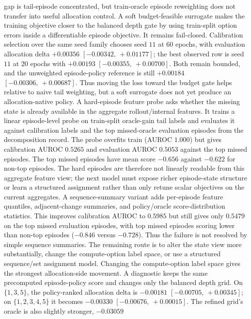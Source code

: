 gap is tail-episode concentrated, but train-oracle episode reweighting does not
transfer into useful allocation control.
A soft budget-feasible surrogate makes the training objective closer to the
balanced depth gate by using train-split option errors inside a differentiable
episode objective.  It remains fail-closed.  Calibration selection over the
same seed family chooses seed $11$ at $60$ epochs, with evaluation allocation
delta $+0.00356$ $[-0.00342,\ +0.01177]$; the best observed row is seed $11$ at
$20$ epochs with $+0.00193$ $[-0.00355,\ +0.00700]$.  Both remain bounded, and
the unweighted episode-policy reference is still $+0.00184$
$[-0.00306,\ +0.00687]$.  Thus moving the loss toward the budget gate helps
relative to naive tail weighting, but a soft surrogate does not yet produce an
allocation-native policy.
A hard-episode feature probe asks whether the missing state is already
available in the aggregate rollout/internal features.  It trains a linear
episode-level probe on train-split oracle-gain tail labels and evaluates it
against calibration labels and the top missed-oracle evaluation episodes from
the decomposition record.  The probe overfits train (AUROC $1.000$) but gives
calibration AUROC $0.5265$ and evaluation AUROC $0.5053$ against the top missed
episodes.  The top missed episodes have mean score $-0.656$ against $-0.622$
for non-top episodes.  The hard episodes are therefore not linearly readable
from this aggregate feature view; the next model must expose richer
episode-state structure or learn a structured assignment rather than only
retune scalar objectives on the current aggregates.
A sequence-summary variant adds per-episode feature quantiles,
adjacent-change summaries, and policy/oracle score-distribution statistics.
This improves calibration AUROC to $0.5985$ but still gives only $0.5479$ on
the top missed evaluation episodes, with top missed episodes scoring lower
than non-top episodes ($-0.846$ versus $-0.728$).  Thus the failure is not
resolved by simple sequence summaries.  The remaining route is to alter the
state view more substantially, change the compute-option label space, or use a
structured sequence/set assignment model.
Changing the compute-option label space gives the strongest allocation-side
movement.  A diagnostic keeps the same precomputed episode-policy score and
changes only the balanced depth grid.  On $\{1,3,5\}$, the policy-ranked
allocation delta is $-0.00181$ $[-0.00705,\ +0.00345]$; on
$\{1,2,3,4,5\}$ it becomes $-0.00330$ $[-0.00676,\ +0.00015]$.  The refined
grid's oracle is also slightly stronger, $-0.03059$
